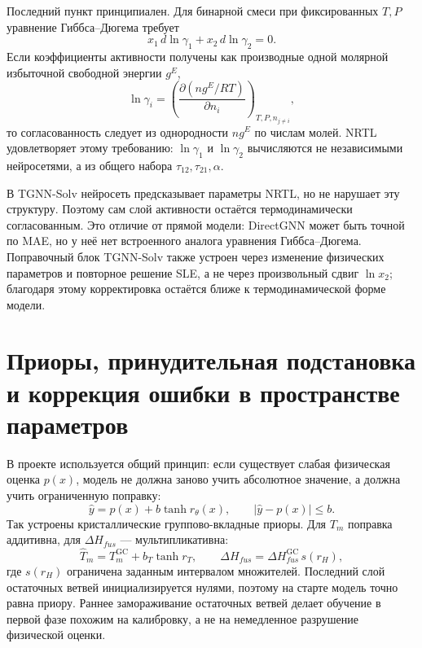 \documentclass[11pt]{article}
\theoremstyle{definition}
\begin{document}
Последний пункт принципиален. Для бинарной смеси при фиксированных $T,P$ уравнение Гиббса--Дюгема требует
\begin{equation*}
    x_1\,d\ln\gamma_1+x_2\,d\ln\gamma_2=0 .
\end{equation*}
Если коэффициенты активности получены как производные одной молярной избыточной свободной энергии $g^E$,
\begin{equation*}
    \ln\gamma_i
    =
    \left(\frac{\partial (n g^E/RT)}{\partial n_i}\right)_{T,P,n_{j\ne i}},
\end{equation*}
то согласованность следует из однородности $n g^E$ по числам молей. NRTL удовлетворяет этому требованию: $\ln\gamma_1$ и $\ln\gamma_2$ вычисляются не независимыми нейросетями, а из общего набора $\tau_{12},\tau_{21},\alpha$.

В TGNN-Solv нейросеть предсказывает параметры NRTL, но не нарушает эту структуру. Поэтому сам слой активности остаётся термодинамически согласованным. Это отличие от прямой модели: DirectGNN может быть точной по MAE, но у неё нет встроенного аналога уравнения Гиббса--Дюгема. Поправочный блок TGNN-Solv также устроен через изменение физических параметров и повторное решение SLE, а не через произвольный сдвиг $\ln x_2$; благодаря этому корректировка остаётся ближе к термодинамической форме модели.

\section{Приоры, принудительная подстановка и коррекция ошибки в пространстве параметров}
\label{app:priors-teacher-correction}

В проекте используется общий принцип: если существует слабая физическая оценка $p(x)$, модель не должна заново учить абсолютное значение, а должна учить ограниченную поправку:
\begin{equation*}
    \hat y=p(x)+b\tanh r_\theta(x),
    \qquad |\hat y-p(x)|\leq b .
\end{equation*}
Так устроены кристаллические группово-вкладные приоры. Для $T_m$ поправка аддитивна, для $\Delta H_{fus}$ --- мультипликативна:
\begin{equation*}
    \widehat T_m=T_m^{\mathrm{GC}}+b_T\tanh r_T,
    \qquad
    \widehat{\Delta H}_{fus}=\Delta H_{fus}^{\mathrm{GC}}\,s(r_H),
\end{equation*}
где $s(r_H)$ ограничена заданным интервалом множителей. Последний слой остаточных ветвей инициализируется нулями, поэтому на старте модель точно равна приору. Раннее замораживание остаточных ветвей делает обучение в первой фазе похожим на калибровку, а не на немедленное разрушение физической оценки.
\end{document}
